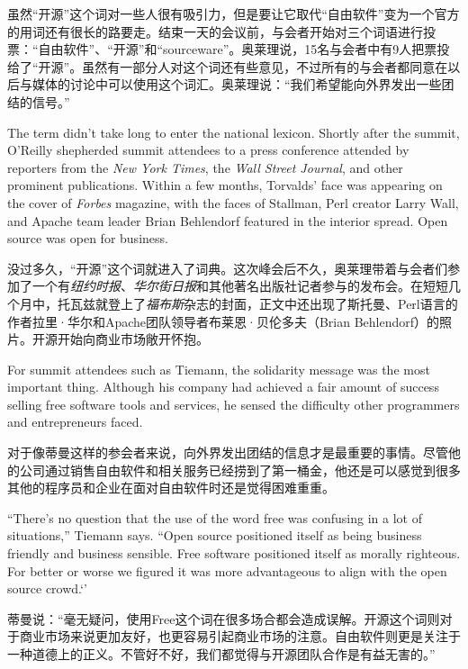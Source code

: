 \ifdefined\chs
虽然``开源''这个词对一些人很有吸引力，但是要让它取代``自由软件''变为一个官方的用词还有很长的路要走。结束一天的会议前，与会者开始对三个词语进行投票：``自由软件''、``开源''和``sourceware''。奥莱理说，15名与会者中有9人把票投给了``开源''。虽然有一部分人对这个词还有些意见，不过所有的与会者都同意在以后与媒体的讨论中可以使用这个词汇。奥莱理说：``我们希望能向外界发出一些团结的信号。''
\fi

\ifdefined\eng
The term didn't take long to enter the national lexicon. Shortly after the summit, O'Reilly shepherded summit attendees to a press conference attended by reporters from the \textit{New York Times}, the \textit{Wall Street Journal}, and other prominent publications. Within a few months, Torvalds' face was appearing on the cover of \textit{Forbes} magazine, with the faces of Stallman, Perl creator Larry Wall, and Apache team leader Brian Behlendorf featured in the interior spread. Open source was open for business.
\fi

\ifdefined\chs
没过多久，``开源''这个词就进入了词典。这次峰会后不久，奥莱理带着与会者们参加了一个有\textit{纽约时报}、\textit{华尔街日报}和其他著名出版社记者参与的发布会。在短短几个月中，托瓦兹就登上了\textit{福布斯}杂志的封面，正文中还出现了斯托曼、Perl语言的作者拉里·华尔和Apache团队领导者布莱恩·贝伦多夫（Brian Behlendorf）的照片。开源开始向商业市场敞开怀抱。
\fi

\ifdefined\eng
For summit attendees such as Tiemann, the solidarity message was the most important thing. Although his company had achieved a fair amount of success selling free software tools and services, he sensed the difficulty other programmers and entrepreneurs faced.
\fi

\ifdefined\chs
对于像蒂曼这样的参会者来说，向外界发出团结的信息才是最重要的事情。尽管他的公司通过销售自由软件和相关服务已经捞到了第一桶金，他还是可以感觉到很多其他的程序员和企业在面对自由软件时还是觉得困难重重。
\fi

\ifdefined\eng
``There's no question that the use of the word free was confusing in a lot of situations,'' Tiemann says. ``Open source positioned itself as being business friendly and business sensible. Free software positioned itself as morally righteous. For better or worse we figured it was more advantageous to align with the open source crowd.‘’
\fi

\ifdefined\chs
蒂曼说：``毫无疑问，使用Free这个词在很多场合都会造成误解。开源这个词则对于商业市场来说更加友好，也更容易引起商业市场的注意。自由软件则更是关注于一种道德上的正义。不管好不好，我们都觉得与开源团队合作是有益无害的。''
\fi

